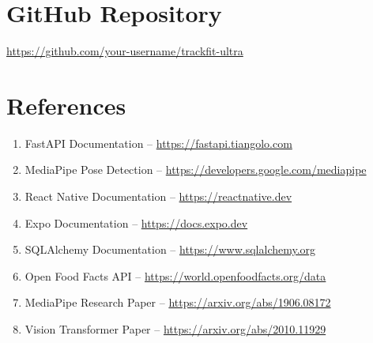 \documentclass[12pt]{report}
\begin{document}
\chapter*{GitHub Repository}
\url{https://github.com/your-username/trackfit-ultra}

\chapter*{References}
\begin{enumerate}
    \item FastAPI Documentation – \url{https://fastapi.tiangolo.com}
    \item MediaPipe Pose Detection – \url{https://developers.google.com/mediapipe}
    \item React Native Documentation – \url{https://reactnative.dev}
    \item Expo Documentation – \url{https://docs.expo.dev}
    \item SQLAlchemy Documentation – \url{https://www.sqlalchemy.org}
    \item Open Food Facts API – \url{https://world.openfoodfacts.org/data}
    \item MediaPipe Research Paper – \url{https://arxiv.org/abs/1906.08172}
    \item Vision Transformer Paper – \url{https://arxiv.org/abs/2010.11929}
\end{enumerate}
\end{document}
